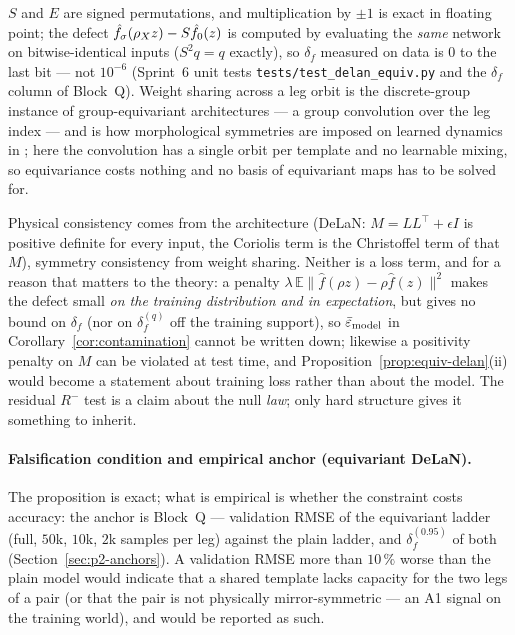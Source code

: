 \begin{remark}
\label{rem:exact-fp}
$S$ and $E$ are signed permutations, and multiplication by $\pm 1$ is exact
in floating point; the defect $\hat f_\sigma(\rho_{X} z) - S\hat f_0(z)$ is
computed by evaluating the \emph{same} network on bitwise-identical inputs
($S^2 q = q$ exactly), so $\delta_f$ measured on data is $0$ to the last
bit --- not $10^{-6}$ (Sprint~6 unit tests \texttt{tests/test\_delan\_equiv.py}
and the $\delta_f$ column of Block~Q). Weight sharing across a leg orbit is
the discrete-group instance of group-equivariant architectures
\cite{cohen2016group,weiler2019general,finzi2021practical} --- a group
convolution over the leg index --- and is how morphological symmetries are
imposed on learned dynamics in \cite{ordonez2025morphological}; here the
convolution has a single orbit per template and no learnable mixing, so
equivariance costs nothing and no basis of equivariant maps has to be
solved for.
\end{remark}

\begin{remark}
\label{rem:no-soft}
Physical consistency comes from the architecture (DeLaN: $M = LL^\top +
\epsilon I$ is positive definite for every input, the Coriolis term is the
Christoffel term of that $M$), symmetry consistency from weight sharing.
Neither is a loss term, and for a reason that matters to the theory: a
penalty $\lambda\,\mathbb{E}\|\hat f(\rho z) - \rho\hat f(z)\|^2$ makes the
defect small \emph{on the training distribution and in expectation}, but
gives no bound on $\delta_f$ (nor on $\delta_f^{(q)}$ off the training
support), so $\bar\varepsilon_{\mathrm{model}}$ in Corollary~\ref{cor:contamination} cannot be
written down; likewise a positivity penalty on $M$ can be violated at test
time, and Proposition~\ref{prop:equiv-delan}(ii) would become a statement
about training loss rather than about the model. The residual $R^{-}$ test
is a claim about the null \emph{law}; only hard structure gives it something
to inherit.
\end{remark}

\paragraph{Falsification condition and empirical anchor (equivariant DeLaN).}
The proposition is exact; what is empirical is whether the constraint costs
accuracy: the anchor is Block~Q --- validation RMSE of the equivariant
ladder (full, $50$k, $10$k, $2$k samples per leg) against the plain ladder,
and $\delta_f^{(0.95)}$ of both (Section~\ref{sec:p2-anchors}). A
validation RMSE more than $10\,\%$ worse than the plain model would indicate
that a shared template lacks capacity for the two legs of a pair (or that
the pair is not physically mirror-symmetric --- an A1 signal on the training
world), and would be reported as such.

